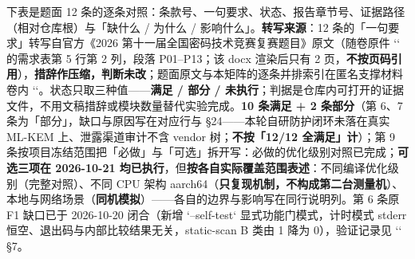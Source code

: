 \documentclass[UTF8,fontset=fandol,11pt,a4paper]{ctexart}
\begin{document}
下表是题面 12 条的逐条对照：条款号、一句要求、状态、报告章节号、证据路径（相对仓库根）与「缺什么 / 为什么 / 影响什么」。\textbf{转写来源}：12 条的「一句要求」转写自官方《2026 第十一届全国密码技术竞赛复赛题目》原文（随卷原件 `\texttt{}` 的需求表第 5 行第 2 列，段落 P01–P13；该 docx 渲染后只有 2 页，\textbf{不按页码引用}），\textbf{措辞作压缩，判断未改}；题面原文与本矩阵的逐条并排索引在匿名支撑材料卷内 `\texttt{}`。状态只取三种值——\textbf{满足 / 部分 / 未执行}；判据是仓库内可打开的证据文件，不用文稿措辞或模块数量替代实验完成。\textbf{10 条满足 + 2 条部分}（第 6、7 条为「部分」，缺口与原因写在对应行与 §24——本轮自研防护闭环未落在真实 ML-KEM 上、泄露渠道审计不含 vendor 树；\textbf{不按「12/12 全满足」计}）；第 9 条按项目冻结范围把「必做」与「可选」拆开写：必做的优化级别对照已完成；\textbf{可选三项在 2026-10-21 均已执行}，但\textbf{按各自实际覆盖范围表述}：不同编译优化级别（完整对照）、不同 CPU 架构 aarch64（\textbf{只复现机制，不构成第二台测量机}）、本地与网络场景（\textbf{同机模拟}）——各自的边界与影响写在同行说明列。第 6 条原 F1 缺口已于 2026-10-20 闭合（新增 `--self-test` 显式功能门模式，计时模式 stderr 恒空、退出码与内部比较结果无关，static-scan B 类由 1 降为 0），验证记录见 `\texttt{}` §7。
\end{document}
